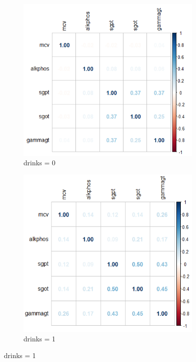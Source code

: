 \newpage
\begin{figure}[!tbh]
	\centering
	\begin{subfigure}{0.5\textwidth}
	\includegraphics[width=1\linewidth]{figures/corr_0}
\caption{drinks = 0}
\label{fig:corr0}
	\end{subfigure}\hfil %
	\begin{subfigure}{0.5\textwidth}
	\includegraphics[width=1\linewidth]{figures/corr_1}
\caption{drinks = 1}
\label{fig:corr1}
	\end{subfigure}\hfil %
\end{figure}



